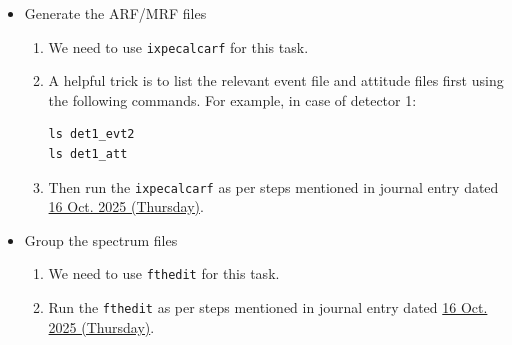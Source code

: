 \begin{itemize}
\begin{enumerate}
			\item Create soft links to these downloaded files, so that it is easier to refer to them, as follows
			\begin{verbatim}
ln -s <<file name>> <<link name>>
			\end{verbatim}
			For example:
			\begin{verbatim}
ln -s ixpe_d2_20211209_alpha075_01.rmf gx13_d02_rmf.fits
			\end{verbatim}
			following which we can use \verb|'gx13_d02_rmf.fits'| as an alias\\ for \verb|'ixpe_d2_20211209_alpha075_01.rmf'|.
		\end{enumerate}
		
		\item Generate the ARF/MRF files
		\begin{enumerate}
			\item We need to use \verb|ixpecalcarf| for this task.
			
			\item A helpful trick is to list the relevant event file and attitude files first using the following commands. For example, in case of detector 1:
			\begin{verbatim}
ls det1_evt2
ls det1_att
			\end{verbatim}
			
			\item Then run the \verb|ixpecalcarf| as per steps mentioned in journal entry dated \hyperref[entry:20251016]{16 Oct. 2025 (Thursday)}.
		\end{enumerate}
		
		\item Group the spectrum files
		\begin{enumerate}
			\item We need to use \verb|fthedit| for this task.
			
			\item Run the \verb|fthedit| as per steps mentioned in journal entry dated \hyperref[entry:20251016]{16 Oct. 2025 (Thursday)}.
		\end{enumerate}
	\end{itemize}